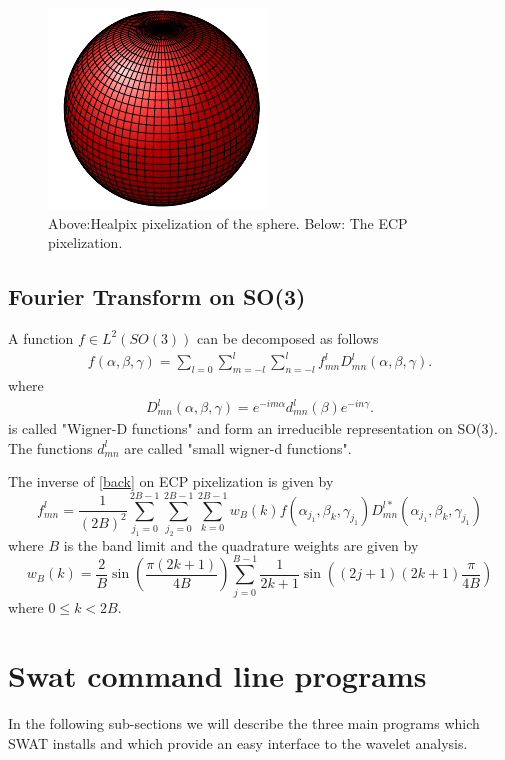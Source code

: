 \documentclass[12pt]{article}
\begin{document}
\begin{figure}[ht]
      \includegraphics[]{cylindrical-f3.pdf}
   \caption{Above:Healpix pixelization of the sphere. Below: The ECP pixelization.}
   \label{healpix}
\end{figure}

\subsection{Fourier Transform on SO(3)}
A function $f \in L^2(SO(3))$ can be decomposed as follows
\begin{eqnarray}
f(\alpha,\beta,\gamma) = \sum_{l = 0}\sum_{m = -l}^l\sum_{n = -l}^l f^l_{mn}D^l_{mn}(\alpha,\beta,\gamma).
\label{back}
\end{eqnarray}
where
\begin{eqnarray}
D^l_{mn}(\alpha,\beta,\gamma) = e^{-im\alpha}d^l_{mn}(\beta)e^{-in\gamma}.
\end{eqnarray}
is called "Wigner-D functions" and form an irreducible representation on SO(3). The
functions $d^l_{mn}$ are called "small wigner-d functions".

The inverse of \ref{back} on ECP pixelization is given by
\begin{equation}
f^l_{mn} = \frac{1}{(2B)^2}\sum_{j_1 = 0}^{2B - 1}\sum_{j_2 = 0}^{2B - 1}\sum_{k = 0}^{2B - 1}
w_B(k)f(\alpha_{j_1},\beta_{k},\gamma_{j_1})D^{l*}_{mn}(\alpha_{j_1},\beta_{k},\gamma_{j_1})
\end{equation}
where $B$ is the band limit and the quadrature weights are given by
\begin{equation}
w_B(k) = \frac{2}{B}\sin\left(\frac{\pi(2k + 1)}{4B}\right)\sum_{j = 0}^{B - 1}
\frac{1}{2k + 1}\sin\left((2j+1)(2k+1)\frac{\pi}{4B}\right)
\end{equation}
where $0\le k < 2B$. 

\section{Swat command line programs}
In the following sub-sections we will describe the three main programs which 
SWAT installs and which provide an easy interface to the wavelet analysis.
\end{document}
